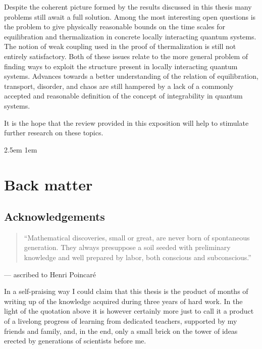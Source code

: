 \documentclass[a4paper,12pt,listof=totoc,index=totoc,bibliography=totoc,headsepline=false,headings=normal,BCOR16.153846mm,DIV12,headinclude,twoside,cleardoublepage=empty,numbers=noenddot,final]{scrreprt}
\theoremstyle{mystyle}
\numberwithin{equation}{section}
\numberwithin{figure}{section}
\numberwithin{lemma}{section}
\numberwithin{theorem}{section}
\numberwithin{corollary}{section}
\numberwithin{definition}{section}
\numberwithin{conjecture}{section}
\numberwithin{observation}{section}
\newcommand{\+}{\mkern2mu}
\DeclareMathOperator{\1}{\mathds{1}}
\begin{document}
Despite the coherent picture formed by the results discussed in this thesis many problems still await a full solution.
Among the most interesting open questions is the problem to give physically reasonable bounds on the time scales for equilibration and thermalization in concrete locally interacting quantum systems.
The notion of weak coupling used in the proof of thermalization is still not entirely satisfactory.
Both of these issues relate to the more general problem of finding ways to exploit the structure present in locally interacting quantum systems.
Advances towards a better understanding of the relation of equilibration, transport, disorder, and chaos are still hampered by a lack of a commonly accepted and reasonable definition of the concept of integrability in quantum systems.

It is the hope that the review provided in this exposition will help to stimulate further research on these topics.

\cleardoublepage

%
\emergencystretch 2.5em
\printbibliography
\emergencystretch 1em

\cleardoublepage

\appendix 

\chapter{Back matter}

\section{Acknowledgements}

\begin{quotation}
  ``Mathematical discoveries, small or great, are never born of spontaneous generation. They always presuppose a soil seeded with preliminary knowledge and well prepared by labor, both conscious and subconscious.''
\end{quotation}
\begin{flushright}
  --- ascribed to Henri Poincar\'e
\end{flushright}

In a self-praising way I could claim that this thesis is the product of months of writing up of the knowledge acquired during three years of hard work.
In the light of the quotation above it is however certainly more just to call it a product of a livelong progress of learning from dedicated teachers, supported by my friends and family, and, in the end, only a small brick on the tower of ideas erected by generations of scientists before me.
\end{document}
